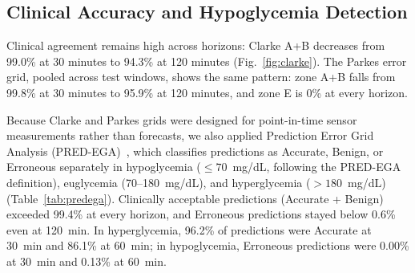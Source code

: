 \documentclass[journal]{IEEEtran}
\begin{document}
\subsection{Clinical Accuracy and Hypoglycemia Detection}

Clinical agreement remains high across horizons: Clarke A+B decreases from 99.0\% at 30 minutes to 94.3\% at 120 minutes (Fig.~\ref{fig:clarke}). The Parkes error grid, pooled across test windows, shows the same pattern: zone A+B falls from 99.8\% at 30 minutes to 95.9\% at 120 minutes, and zone E is 0\% at every horizon.

Because Clarke and Parkes grids were designed for point-in-time sensor measurements rather than forecasts, we also applied Prediction Error Grid Analysis (PRED-EGA)~\cite{ref53}, which classifies predictions as Accurate, Benign, or Erroneous separately in hypoglycemia ($\le 70$~mg/dL, following the PRED-EGA definition), euglycemia (70--180~mg/dL), and hyperglycemia ($> 180$~mg/dL) (Table~\ref{tab:predega}). Clinically acceptable predictions (Accurate + Benign) exceeded 99.4\% at every horizon, and Erroneous predictions stayed below 0.6\% even at 120~min. In hyperglycemia, 96.2\% of predictions were Accurate at 30~min and 86.1\% at 60~min; in hypoglycemia, Erroneous predictions were 0.00\% at 30~min and 0.13\% at 60~min.

\begin{table}[t]
\centering
\caption{PRED-EGA (Sivananthan et al.~\cite{ref53}) clinical prediction error grid results across 12 subjects (mean $\pm$ SD across subjects)}
\label{tab:predega}
\footnotesize
{}
\end{table}
\end{document}
